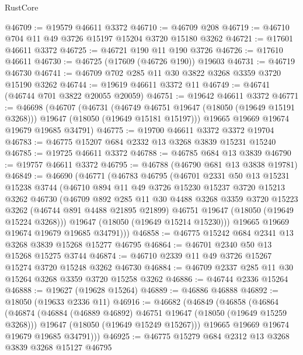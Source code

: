 \begin{lexlean}{RustCore}
\begin{coremodule}
@46709 := @19579 @46611 @3372
@46710 := @46709 @208
@46719 := @46710 @704 @11 @49 @3726 @15197 @15204 @3720 @15180 @3262
@46721 := @17601 @46611 @3372
@46725 := @46721 @190 @11 @190 @3726
@46726 := @17610 @46611
@46730 := @46725 (@17609 (@46726 @190)) @19603
@46731 := @46719 @46730
@46741 := @46709 @702 @285 @11 @30 @3822 @3268 @3359 @3720 @15190 @3262
@46744 := @19619 @46611 @3372 @11
@46749 := @46741 (@46744 @701 @3822 @20055 @20059)
@46751 := @19642 @46611 @3372
@46771 := @46698
    (@46707
      (@46731
        (@46749 @46751 @19647 (@18050 (@19649 @15191 @3268)))
        @19647
        (@18050 (@19649 @15181 @15197)))
      @19665
      @19669
      @19674
      @19679
      @19685
      @34791)
@46775 := @19700 @46611 @3372 @3372 @19704
@46783 := @46775 @15207 @684 @2332 @13 @3268 @3839 @15231 @15240
@46785 := @19725 @46611 @3372
@46788 := @46785 @684 @13 @3839
@46790 := @19757 @46611 @3372
@46795 := @46788 (@46790 @681 @13 @3838 @19781)
@46849 := @46690
    (@46771
      (@46783
        @46795
        (@46701
          @2331
          @50
          @13
          @15231
          @15238
          @3744
          (@46710
            @894
            @11
            @49
            @3726
            @15230
            @15237
            @3720
            @15213
            @3262
            @46730
            (@46709
              @892
              @285
              @11
              @30
              @4488
              @3268
              @3359
              @3720
              @15223
              @3262
              (@46744 @891 @4488 @21895 @21899)
              @46751
              @19647
              (@18050 (@19649 @15224 @3268)))
            @19647
            (@18050 (@19649 @15214 @15230)))
          @19665
          @19669
          @19674
          @19679
          @19685
          @34791)))
@46858 := @46775 @15242 @684 @2341 @13 @3268 @3839 @15268 @15277 @46795
@46864 := @46701 @2340 @50 @13 @15268 @15275 @3744
@46874 := @46710 @2339 @11 @49 @3726 @15267 @15274 @3720 @15248 @3262 @46730
@46884 := @46709 @2337 @285 @11 @30 @15264 @3268 @3359 @3720 @15258 @3262
@46886 := @46744 @2336 @15264
@46888 := @19627 (@19628 @15264)
@46889 := @46886 @46888
@46892 := @18050 (@19633 @2336 @11)
@46916 := @46682
    (@46849
      (@46858
        (@46864
          (@46874
            (@46884 (@46889 @46892) @46751 @19647 (@18050 (@19649 @15259 @3268)))
            @19647
            (@18050 (@19649 @15249 @15267)))
          @19665
          @19669
          @19674
          @19679
          @19685
          @34791)))
@46925 := @46775 @15279 @684 @2312 @13 @3268 @3839 @3268 @15127 @46795

\end{coremodule}
\end{lexlean}
